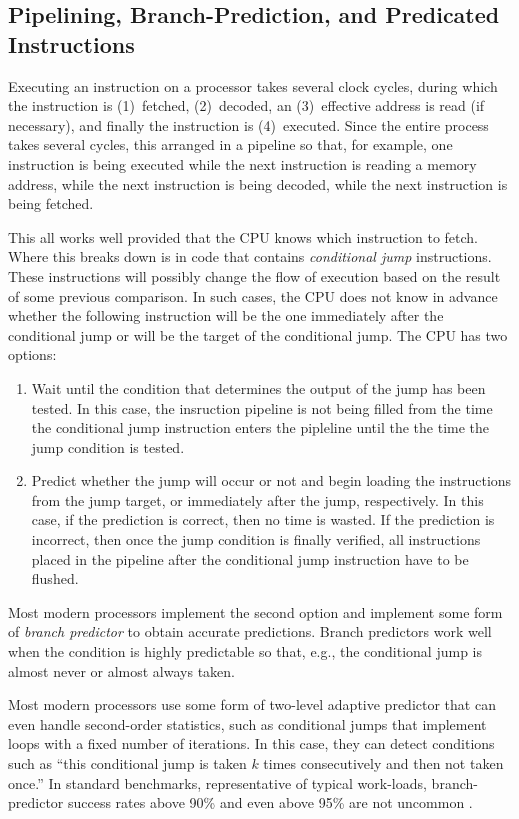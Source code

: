 \documentclass{patmorin}
\begin{document}
\subsection{Pipelining, Branch-Prediction, and Predicated Instructions}

Executing an instruction on a processor takes several clock cycles, during
which the instruction is (1)~fetched, (2)~decoded, an (3)~effective
address is read (if necessary), and finally the instruction is
(4)~executed.  Since the entire process takes several cycles, this
arranged in a pipeline so that, for example, one instruction is being
executed while the next instruction is reading a memory address, while
the next instruction is being decoded, while the next instruction is
being fetched.

This all works well provided that the CPU knows which instruction to
fetch.  Where this breaks down is in code that contains \emph{conditional
jump} instructions. These instructions will possibly change the flow of
execution based on the result of some previous comparison.  In such cases,
the CPU does not know in advance whether the following instruction will
be the one immediately after the conditional jump or will be the target
of the conditional jump. The CPU has two options: 
\begin{enumerate}
\item Wait until the condition that determines the output
 of the jump has been tested. In this case, the insruction pipeline is
 not being filled from the time the conditional jump instruction enters
 the pipleline until the the time the jump condition is tested.

\item Predict whether the jump will occur or not and begin loading
the instructions from the jump target, or immediately after the jump,
respectively.  In this case, if the prediction is correct, then no time
is wasted. If the prediction is incorrect, then once the jump condition
is finally verified, all instructions placed in the pipeline after the
conditional jump instruction have to be flushed.
\end{enumerate}

Most modern processors implement the second option and implement
some form of \emph{branch predictor} to obtain accurate predictions.
Branch predictors work well when the condition is highly predictable so
that, e.g., the conditional jump is almost never or almost always taken.

Most modern processors use some form of two-level adaptive predictor
\cite{yeh.patt.two-level} that can even handle second-order statistics,
such as conditional jumps that implement loops with a fixed number of
iterations. In this case, they can detect conditions such as ``this
conditional jump is taken $k$ times consecutively and then not taken
once.''  In standard benchmarks, representative of typical work-loads,
branch-predictor success rates above 90\% and even above 95\% are not
uncommon \cite{X}.
\end{document}
